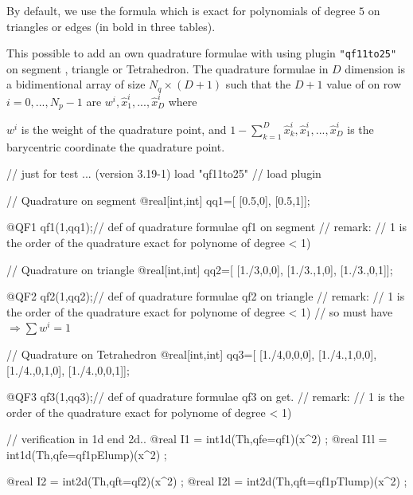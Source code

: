 \documentclass[a4paper,twoside,12pt]{book}
\begin{document}
 

\begin{note}
 By default,  we use the formula which is exact for polynomials of degree $5$ on triangles or edges (in bold in three tables).
\end{note}

This possible to add an own quadrature formulae with using plugin \texttt{"qf11to25"} on segment  , triangle or Tetrahedron.
The quadrature formulae  in $D$ dimension is a bidimentional  array of size $N_q\times (D+1)$ 
such that the $D+1$ value of on row $i=0,...,N_p-1$  are $w^i,\hat{x}^i_1,...,\hat{x}^i_D$ where

$w^i$ is the weight of the quadrature point, and $1-\sum_{k=1}^D \hat{x}^i_k ,\hat{x}^i_1,...,\hat{x}^i_D$
is the barycentric coordinate the quadrature point.
  
\bFF
// just for test ... (version 3.19-1) 
load "qf11to25" // load plugin                   
     
  // Quadrature on segment \hfilll
    @real[int,int] qq1=[ 
                      [0.5,0],
                      [0.5,1]];

  @QF1 qf1(1,qq1);// def of quadrature formulae qf1 on segment 
  // remark:\hfilll
  //  1 is the order of the quadrature  exact for polynome of degree < 1) 
 
  // Quadrature on triangle \hfilll
  @real[int,int] qq2=[
                     [1./3,0,0],
                     [1./3.,1,0],
                     [1./3.,0,1]];
                     
  @QF2 qf2(1,qq2);// def of quadrature formulae qf2 on triangle 
  // remark:\hfilll
  //  1 is the order of the quadrature  exact for polynome of degree < 1) 
  // so must have $ \Longrightarrow \sum w^i  = 1 $\hfilll
  
   // Quadrature on Tetrahedron   \hfilll
  @real[int,int] qq3=[
     [1./4,0,0,0],
     [1./4.,1,0,0],
     [1./4.,0,1,0],
     [1./4.,0,0,1]];
     
  @QF3 qf3(1,qq3);// def of quadrature formulae qf3 on get. 
  // remark:\hfilll
  //  1 is the order of the quadrature  exact for polynome of degree < 1) 


  // verification in 1d end 2d.. 
  @real I1 = int1d(Th,qfe=qf1)(x^2) ;
  @real I1l = int1d(Th,qfe=qf1pElump)(x^2) ;

  @real I2 = int2d(Th,qft=qf2)(x^2) ;
  @real I2l = int2d(Th,qft=qf1pTlump)(x^2) ;
\end{document}

